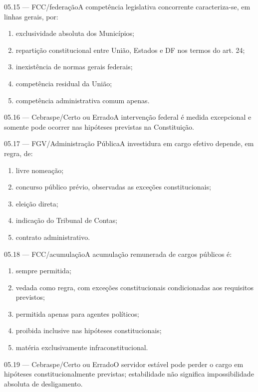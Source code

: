 \begin{questao}{ 05.15 — FCC/federação}A competência legislativa concorrente caracteriza-se, em linhas gerais, por:\begin{enumerate}[label=\Alph*)]\item exclusividade absoluta dos Municípios;\item repartição constitucional entre União, Estados e DF nos termos do art. 24;\item inexistência de normas gerais federais;\item competência residual da União;\item competência administrativa comum apenas.\end{enumerate}\end{questao}
\begin{questao}{ 05.16 — Cebraspe/Certo ou Errado}A intervenção federal é medida excepcional e somente pode ocorrer nas hipóteses previstas na Constituição.\end{questao}
\begin{questao}{ 05.17 — FGV/Administração Pública}A investidura em cargo efetivo depende, em regra, de:\begin{enumerate}[label=\Alph*)]\item livre nomeação;\item concurso público prévio, observadas as exceções constitucionais;\item eleição direta;\item indicação do Tribunal de Contas;\item contrato administrativo.\end{enumerate}\end{questao}
\begin{questao}{ 05.18 — FCC/acumulação}A acumulação remunerada de cargos públicos é:\begin{enumerate}[label=\Alph*)]\item sempre permitida;\item vedada como regra, com exceções constitucionais condicionadas aos requisitos previstos;\item permitida apenas para agentes políticos;\item proibida inclusive nas hipóteses constitucionais;\item matéria exclusivamente infraconstitucional.\end{enumerate}\end{questao}
\begin{questao}{ 05.19 — Cebraspe/Certo ou Errado}O servidor estável pode perder o cargo em hipóteses constitucionalmente previstas; estabilidade não significa impossibilidade absoluta de desligamento.\end{questao}
